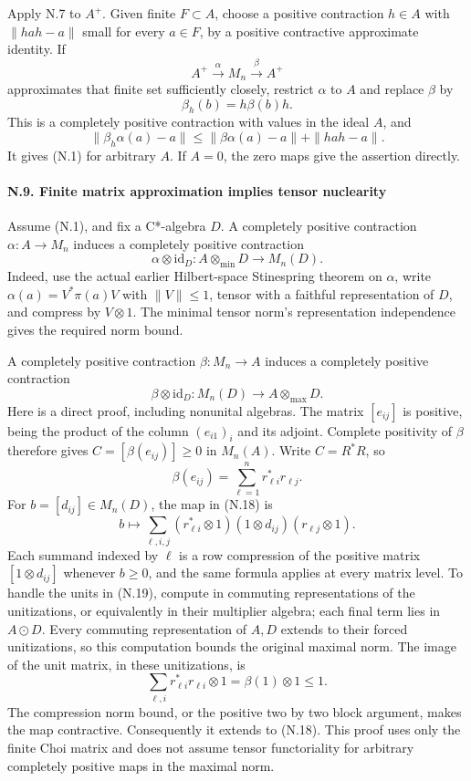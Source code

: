 \documentclass[
  11pt,
]{article}
\begin{document}
Apply N.7 to \(A^+\). Given finite \(F\subset A\), choose a positive
contraction \(h\in A\) with \(\|hah-a\|\) small for every \(a\in F\), by
a positive contractive approximate identity. If \[
A^+\xrightarrow{\alpha}M_n\xrightarrow{\beta}A^+
\] approximates that finite set sufficiently closely, restrict
\(\alpha\) to \(A\) and replace \(\beta\) by \[
\beta_h(b)=h\beta(b)h.
\] This is a completely positive contraction with values in the ideal
\(A\), and \[
\|\beta_h\alpha(a)-a\|
\leq\|\beta\alpha(a)-a\|+\|hah-a\|.
\tag{N.16}
\] It gives (N.1) for arbitrary \(A\). If \(A=0\), the zero maps give
the assertion directly.

\paragraph{N.9. Finite matrix approximation implies tensor
nuclearity}\label{n.9.-finite-matrix-approximation-implies-tensor-nuclearity}

Assume (N.1), and fix a C*-algebra \(D\). A completely positive
contraction \(\alpha:A\to M_n\) induces a completely positive
contraction \[
\alpha\otimes\mathrm{id}_D:A\otimes_{\min}D\to M_n(D).
\tag{N.17}
\] Indeed, use the actual earlier Hilbert-space Stinespring theorem on
\(\alpha\), write \(\alpha(a)=V^*\pi(a)V\) with \(\|V\|\leq1\), tensor
with a faithful representation of \(D\), and compress by \(V\otimes1\).
The minimal tensor norm's representation independence gives the required
norm bound.

A completely positive contraction \(\beta:M_n\to A\) induces a
completely positive contraction \[
\beta\otimes\mathrm{id}_D:M_n(D)\to A\otimes_{\max}D.
\tag{N.18}
\] Here is a direct proof, including nonunital algebras. The matrix
\([e_{ij}]\) is positive, being the product of the column \((e_{i1})_i\)
and its adjoint. Complete positivity of \(\beta\) therefore gives
\(C=[\beta(e_{ij})]\geq0\) in \(M_n(A)\). Write \(C=R^*R\), so \[
\beta(e_{ij})=\sum_{\ell=1}^n r_{\ell i}^*r_{\ell j}.
\] For \(b=[d_{ij}]\in M_n(D)\), the map in (N.18) is \[
b\longmapsto\sum_{\ell,i,j}
(r_{\ell i}^*\otimes1)(1\otimes d_{ij})(r_{\ell j}\otimes1).
\tag{N.19}
\] Each summand indexed by \(\ell\) is a row compression of the positive
matrix \([1\otimes d_{ij}]\) whenever \(b\geq0\), and the same formula
applies at every matrix level. To handle the units in (N.19), compute in
commuting representations of the unitizations, or equivalently in their
multiplier algebra; each final term lies in \(A\odot D\). Every
commuting representation of \(A,D\) extends to their forced
unitizations, so this computation bounds the original maximal norm. The
image of the unit matrix, in these unitizations, is \[
\sum_{\ell,i}r_{\ell i}^*r_{\ell i}\otimes1
=\beta(1)\otimes1\leq1.
\] The compression norm bound, or the positive two by two block
argument, makes the map contractive. Consequently it extends to (N.18).
This proof uses only the finite Choi matrix and does not assume tensor
functoriality for arbitrary completely positive maps in the maximal
norm.
\end{document}
